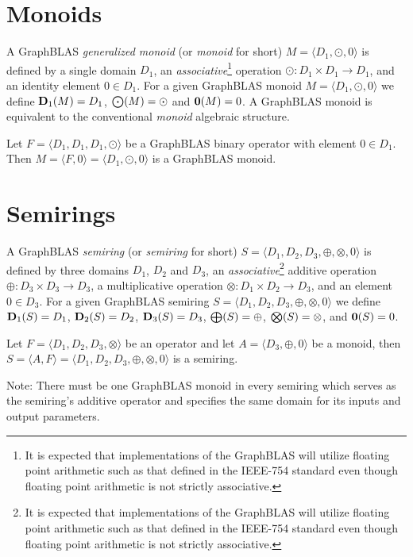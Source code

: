 \section{Monoids}

A GraphBLAS \emph{generalized monoid} (or \emph{monoid} for short) $M =
\langle D_1,\odot,0 \rangle$ is defined by a single domain $D_1$, an 
\emph{associative}\footnote{It is expected that implementations of the GraphBLAS
will utilize floating point arithmetic such as that defined in the IEEE-754 standard even though
floating point arithmetic is not strictly associative.} 
operation $\odot: D_1 \times D_1 \rightarrow D_1$,
and an identity element $0 \in D_1$.  For a given GraphBLAS monoid $M=\langle
D_1,\odot,0 \rangle$ we define $\bold{D}_1(M) = D_1$, $\bold{\bigodot}(M) =
\odot$ and $\bold{0}(M) = 0$.  A GraphBLAS monoid is equivalent to 
the conventional \emph{monoid} algebraic structure.

Let $F = \langle D_1,D_1,D_1,\odot \rangle$ be a GraphBLAS binary operator
with element $0 \in D_1$.  Then $M = \langle F,0 \rangle = \langle
D_1,\odot,0 \rangle$ is a GraphBLAS monoid.

\section{Semirings}

A GraphBLAS \emph{semiring} (or \emph{semiring} for short)
$S=\langle D_1,D_2,D_3,\oplus,\otimes,0 \rangle$ is defined by
three domains $D_1$, $D_2$ and $D_3$, an \emph{associative}\footnote{It is expected 
that implementations of the GraphBLAS will utilize floating point arithmetic 
such as that defined in the IEEE-754 standard even though
floating point arithmetic is not strictly associative.} 
additive operation $\oplus : D_3 \times D_3 \rightarrow D_3$, 
a multiplicative operation $\otimes : D_1 \times D_2 \rightarrow
D_3$, and an element $0 \in D_3$.
For a given GraphBLAS semiring $S=\langle D_1,
D_2, D_3,\oplus,\otimes,0 \rangle$ we define $\bold{D}_1(S) = D_1$,
$\bold{D}_2(S) = D_2$, $\bold{D}_3(S) = D_3$, $\bold{\bigoplus}(S) =
\oplus$, $\bold{\bigotimes}(S) = \otimes$, and ${\bf 0}(S) = 0$. 

Let $F = \langle D_1,D_2,D_3,\otimes \rangle$ be an operator
and let $A = \langle D_3,\oplus,0 \rangle$ be a monoid,
then $S= \langle A,F \rangle = \langle D_1,D_2,D_3,\oplus,\otimes,0 \rangle$
is a semiring.

Note: There must be one GraphBLAS monoid in every semiring which 
serves as the semiring's additive operator and  
specifies the same domain for its inputs and output parameters. 

